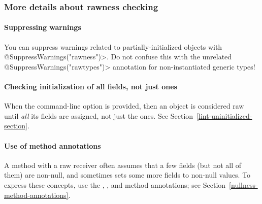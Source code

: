 


\subsubsection{More details about rawness checking\label{rawness-checking}}


\paragraph{Suppressing warnings\label{rawness-checking-suppressing-warnings}}

\begin{sloppypar}
You can suppress warnings related to partially-initialized objects with
\<@SuppressWarnings("rawness")>.  Do not confuse this with the unrelated
\<@SuppressWarnings("rawtypes")> annotation for non-instantiated generic types!
\end{sloppypar}


\paragraph{Checking initialization of all fields, not just  ones\label{rawness-checking-checking-all-fields}}

When the  command-line option is provided, then
an object is considered raw until \emph{all} its fields are assigned, not
just the  ones.  See Section~\ref{lint-uninitialized-section}.


\paragraph{Use of method annotations\label{rawness-checking-method-annotations}}

A method with a raw receiver often assumes that a few fields (but not all
of them) are non-null, and sometimes sets some more fields to non-null
values.  To express these concepts, use the
,
, and
 method annotations;
see Section~\ref{nullness-method-annotations}.


